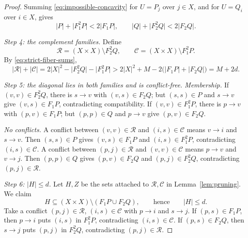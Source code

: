\documentclass[11pt]{article}
\theoremstyle{remark}
\newcommand{\abs}[1]{\lvert #1\rvert}
\begin{document}
\begin{proof}
Summing \eqref{eq:impossible-concavity} for $U=P_j$ over $j\in X$, and for
$U=Q_i$ over $i\in X$, gives
\begin{equation}\label{eq:strict-fiber-sums}
 \abs{P}+\abs{F_1^2P}<2\abs{F_1P},\qquad
 \abs{Q}+\abs{F_2^2Q}<2\abs{F_2Q}.
\end{equation}

\smallskip\noindent\emph{Step 4: the complement families.}  Define
\[
 \mathcal R=(X\times X)\setminus F_2^2Q,
 \qquad
 \mathcal C=(X\times X)\setminus F_1^2P.
\]
By \eqref{eq:strict-fiber-sums},
\begin{equation}\label{eq:complement-gain}
 \abs{\mathcal R}+\abs{\mathcal C}
 =2\abs{X}^2-\abs{F_2^2Q}-\abs{F_1^2P}
 >2\abs{X}^2+M-2\bigl(\abs{F_1P}+\abs{F_2Q}\bigr)
 =M+2d.
\end{equation}

\smallskip\noindent\emph{Step 5: the diagonal lies in both families and is
conflict-free.}
\emph{Membership.}  If $(v,v)\in F_2^2Q$, there is $s\to v$ with
$(v,s)\in F_2Q$; but $(s,s)\in P$ and $s\to v$ give $(v,s)\in F_1P$,
contradicting compatibility.  If $(v,v)\in F_1^2P$, there is $p\to v$ with
$(p,v)\in F_1P$; but $(p,p)\in Q$ and $p\to v$ give $(p,v)\in F_2Q$.

\emph{No conflicts.}  A conflict between $(v,v)\in\mathcal R$ and
$(i,s)\in\mathcal C$ means $v\to i$ and $s\to v$.  Then $(s,s)\in P$ gives
$(v,s)\in F_1P$ and $(i,s)\in F_1^2P$, contradicting $(i,s)\in\mathcal C$.
A conflict between $(p,j)\in\mathcal R$ and $(v,v)\in\mathcal C$ means
$p\to v$ and $v\to j$.  Then $(p,p)\in Q$ gives $(p,v)\in F_2Q$ and
$(p,j)\in F_2^2Q$, contradicting $(p,j)\in\mathcal R$.

\smallskip\noindent\emph{Step 6: $\abs H\le d$.}
Let $H,Z$ be the sets attached to $\mathcal R,\mathcal C$ in
Lemma~\ref{lem:pruning}.  We claim
\begin{equation}\label{eq:old-uncovered-bound}
 H\subseteq (X\times X)\setminus(F_1P\cup F_2Q),
 \qquad\text{hence}\qquad \abs{H}\le d .
\end{equation}
Take a conflict $(p,j)\in\mathcal R$, $(i,s)\in\mathcal C$ with $p\to i$ and
$s\to j$.  If $(p,s)\in F_1P$, then $p\to i$ puts $(i,s)$ in $F_1^2P$,
contradicting $(i,s)\in\mathcal C$.  If $(p,s)\in F_2Q$, then $s\to j$ puts
$(p,j)$ in $F_2^2Q$, contradicting $(p,j)\in\mathcal R$.


\end{proof}
\end{document}
